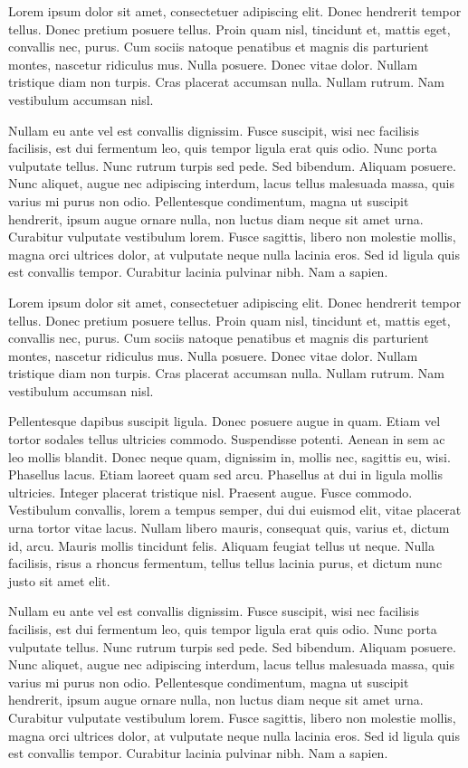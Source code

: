 Lorem ipsum dolor sit amet, consectetuer adipiscing elit.  Donec
hendrerit tempor tellus.  Donec pretium posuere tellus.  Proin quam
nisl, tincidunt et, mattis eget, convallis nec, purus.  Cum sociis
natoque penatibus et magnis dis parturient montes, nascetur ridiculus
mus.  Nulla posuere.  Donec vitae dolor.  Nullam tristique diam non
turpis.  Cras placerat accumsan nulla.  Nullam rutrum.  Nam vestibulum
accumsan nisl.

Nullam eu ante vel est convallis dignissim.  Fusce suscipit, wisi nec
facilisis facilisis, est dui fermentum leo, quis tempor ligula erat
quis odio.  Nunc porta vulputate tellus.  Nunc rutrum turpis sed pede.
Sed bibendum.  Aliquam posuere.  Nunc aliquet, augue nec adipiscing
interdum, lacus tellus malesuada massa, quis varius mi purus non odio.
Pellentesque condimentum, magna ut suscipit hendrerit, ipsum augue
ornare nulla, non luctus diam neque sit amet urna.  Curabitur
vulputate vestibulum lorem.  Fusce sagittis, libero non molestie
mollis, magna orci ultrices dolor, at vulputate neque nulla lacinia
eros.  Sed id ligula quis est convallis tempor.  Curabitur lacinia
pulvinar nibh.  Nam a sapien.

Lorem ipsum dolor sit amet, consectetuer adipiscing elit.  Donec
hendrerit tempor tellus.  Donec pretium posuere tellus.  Proin quam
nisl, tincidunt et, mattis eget, convallis nec, purus.  Cum sociis
natoque penatibus et magnis dis parturient montes, nascetur ridiculus
mus.  Nulla posuere.  Donec vitae dolor.  Nullam tristique diam non
turpis.  Cras placerat accumsan nulla.  Nullam rutrum.  Nam vestibulum
accumsan nisl.


Pellentesque dapibus suscipit ligula.  Donec posuere augue in quam.
Etiam vel tortor sodales tellus ultricies commodo.  Suspendisse
potenti.  Aenean in sem ac leo mollis blandit.  Donec neque quam,
dignissim in, mollis nec, sagittis eu, wisi.  Phasellus lacus.  Etiam
laoreet quam sed arcu.  Phasellus at dui in ligula mollis ultricies.
Integer placerat tristique nisl.  Praesent augue.  Fusce commodo.
Vestibulum convallis, lorem a tempus semper, dui dui euismod elit,
vitae placerat urna tortor vitae lacus.  Nullam libero mauris,
consequat quis, varius et, dictum id, arcu.  Mauris mollis tincidunt
felis.  Aliquam feugiat tellus ut neque.  Nulla facilisis, risus a
rhoncus fermentum, tellus tellus lacinia purus, et dictum nunc justo
sit amet elit.

Nullam eu ante vel est convallis dignissim.  Fusce suscipit, wisi nec
facilisis facilisis, est dui fermentum leo, quis tempor ligula erat
quis odio.  Nunc porta vulputate tellus.  Nunc rutrum turpis sed pede.
Sed bibendum.  Aliquam posuere.  Nunc aliquet, augue nec adipiscing
interdum, lacus tellus malesuada massa, quis varius mi purus non odio.
Pellentesque condimentum, magna ut suscipit hendrerit, ipsum augue
ornare nulla, non luctus diam neque sit amet urna.  Curabitur
vulputate vestibulum lorem.  Fusce sagittis, libero non molestie
mollis, magna orci ultrices dolor, at vulputate neque nulla lacinia
eros.  Sed id ligula quis est convallis tempor.  Curabitur lacinia
pulvinar nibh.  Nam a sapien.


